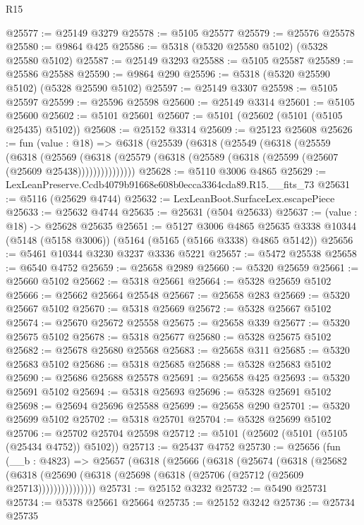 \begin{lexlean}{R15}
\begin{coremodule}
{{{{{{{{{{{@25577 := @25149 @3279
@25578 := @5105 @25577
@25579 := @25576 @25578
@25580 := @9864 @425
@25586 := @5318 (@5320 @25580 @5102) (@5328 @25580 @5102)
@25587 := @25149 @3293
@25588 := @5105 @25587
@25589 := @25586 @25588
@25590 := @9864 @290
@25596 := @5318 (@5320 @25590 @5102) (@5328 @25590 @5102)
@25597 := @25149 @3307
@25598 := @5105 @25597
@25599 := @25596 @25598
@25600 := @25149 @3314
@25601 := @5105 @25600
@25602 := @5101 @25601
@25607 := @5101 (@25602 (@5101 (@5105 @25435) @5102))
@25608 := @25152 @3314
@25609 := @25123 @25608
@25626 := fun (value : @18) =>
  @6318
    (@25539
      (@6318
        (@25549
          (@6318
            (@25559
              (@6318
                (@25569
                  (@6318 (@25579 (@6318 (@25589 (@6318 (@25599 (@25607 (@25609 @25438)))))))))))))))
@25628 := @5110 @3006 @4865
@25629 := LexLeanPreserve.Ccdb4079b91668e608b0ecca3364cda89.R15.__fits_73
@25631 := @5116 (@25629 @4744)
@25632 := LexLeanBoot.SurfaceLex.escapePiece
@25633 := @25632 @4744
@25635 := @25631 (@504 @25633)
@25637 := (value : @18) -> @25628 @25635
@25651 := @5127
    @3006
    @4865
    @25635
    @3338
    @10344
    (@5148 (@5158 @3006))
    (@5164 (@5165 (@5166 @3338) @4865 @5142))
@25656 := @5461 @10344 @3230 @3237 @3336 @5221
@25657 := @5472 @25538
@25658 := @6540 @4752
@25659 := @25658 @2989
@25660 := @5320 @25659
@25661 := @25660 @5102
@25662 := @5318 @25661
@25664 := @5328 @25659 @5102
@25666 := @25662 @25664 @25548
@25667 := @25658 @283
@25669 := @5320 @25667 @5102
@25670 := @5318 @25669
@25672 := @5328 @25667 @5102
@25674 := @25670 @25672 @25558
@25675 := @25658 @339
@25677 := @5320 @25675 @5102
@25678 := @5318 @25677
@25680 := @5328 @25675 @5102
@25682 := @25678 @25680 @25568
@25683 := @25658 @311
@25685 := @5320 @25683 @5102
@25686 := @5318 @25685
@25688 := @5328 @25683 @5102
@25690 := @25686 @25688 @25578
@25691 := @25658 @425
@25693 := @5320 @25691 @5102
@25694 := @5318 @25693
@25696 := @5328 @25691 @5102
@25698 := @25694 @25696 @25588
@25699 := @25658 @290
@25701 := @5320 @25699 @5102
@25702 := @5318 @25701
@25704 := @5328 @25699 @5102
@25706 := @25702 @25704 @25598
@25712 := @5101 (@25602 (@5101 (@5105 (@25434 @4752)) @5102))
@25713 := @25437 @4752
@25730 := @25656
    (fun (__b : @4823) =>
    @25657
      (@6318
        (@25666
          (@6318
            (@25674
              (@6318
                (@25682
                  (@6318 (@25690 (@6318 (@25698 (@6318 (@25706 (@25712 (@25609 @25713)))))))))))))))
@25731 := @25152 @3232
@25732 := @5490 @25731
@25734 := @5378 @25661 @25664
@25735 := @25152 @3242
@25736 := @25734 @25735
}}}}}}}}}}}
\end{coremodule}
\end{lexlean}
